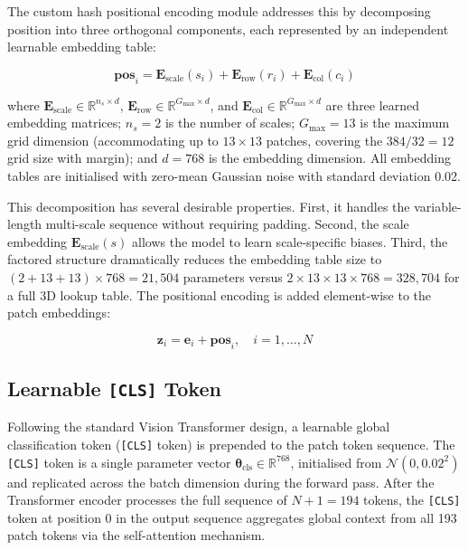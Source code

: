 The custom hash positional encoding module addresses this by decomposing position
into three orthogonal components, each represented by an independent learnable embedding
table:

\begin{equation}
    \mathbf{pos}_i = \mathbf{E}_{\text{scale}}(s_i) + \mathbf{E}_{\text{row}}(r_i)
                   + \mathbf{E}_{\text{col}}(c_i)
    \label{eq:hash_pos}
\end{equation}

where $\mathbf{E}_{\text{scale}} \in \mathbb{R}^{n_s \times d}$,
$\mathbf{E}_{\text{row}} \in \mathbb{R}^{G_{\max} \times d}$, and
$\mathbf{E}_{\text{col}} \in \mathbb{R}^{G_{\max} \times d}$ are three learned embedding
matrices; $n_s = 2$ is the number of scales; $G_{\max} = 13$ is the maximum grid
dimension (accommodating up to $13 \times 13$ patches, covering the $384/32 = 12$
grid size with margin); and $d = 768$ is the embedding dimension. All embedding tables are
initialised with zero-mean Gaussian noise with standard deviation 0.02.

This decomposition has several desirable properties. First, it handles the variable-length
multi-scale sequence without requiring padding. Second, the scale embedding
$\mathbf{E}_{\text{scale}}(s)$ allows the model to learn scale-specific biases. Third,
the factored structure dramatically reduces the embedding table size to
$(2 + 13 + 13) \times 768 = 21{,}504$ parameters versus $2 \times 13 \times 13 \times
768 = 328{,}704$ for a full 3D lookup table. The positional encoding is added
element-wise to the patch embeddings:

\begin{equation}
    \mathbf{z}_i = \mathbf{e}_i + \mathbf{pos}_i, \quad i = 1, \ldots, N
\end{equation}

\subsection{Learnable \texttt{[CLS]} Token}

Following the standard Vision Transformer design, a learnable global classification
token (\texttt{[CLS]} token) is prepended to the patch token sequence. The \texttt{[CLS]}
token is a single parameter vector $\boldsymbol{\theta}_{\text{cls}} \in \mathbb{R}^{768}$,
initialised from $\mathcal{N}(0, 0.02^2)$ and replicated across the batch dimension
during the forward pass. After the Transformer encoder processes the full sequence of
$N + 1 = 194$ tokens, the \texttt{[CLS]} token at position 0 in the output sequence
aggregates global context from all 193 patch tokens via the self-attention mechanism.

